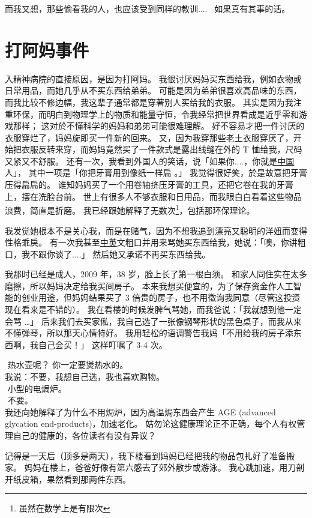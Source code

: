\documentclass[12pt]{report}
\newcommand{\tab}{\hspace*{1cm}}
\newcommand*\dashh{\textemdash\,\,}
\begin{document}
而我又想，那些偷看我的人，也应该受到同样的教训....~ 如果真有其事的话。

\chapter{打阿妈事件}

入精神病院的直接原因，是因为打阿妈。 我很讨厌妈妈买东西给我，例如衣物或日常用品，而她几乎从不买东西给弟弟。 可能是因为弟弟很喜欢高品味的东西，而我比较不修边幅，我这辈子通常都是穿著别人买给我的衣服。 其实是因为我注重环保，而明白到物理学上的物质和能量守恒，令我经常把世界看成是近乎零和游戏那样； 这对於不懂科学的妈妈和弟弟可能很难理解。 好不容易才把一件讨厌的衣服穿烂了，妈妈旋即买一件新的回来。 又，因为我穿那些老土衣服穿厌了，开始把衣服反转来穿，而妈妈竟然买了一件款式是露出线缝在外的 T 恤给我，尺码又紧又不舒服。 还有一次，我看到外国人的笑话，说「如果你....，你就是\uline{中国}人」， 其中一项是「你把牙膏用到像纸一样扁 。」 我觉得很好笑，於是故意把牙膏压得扁扁的。 谁知妈妈买了一个用卷轴挤压牙膏的工具，还把它卷在我的牙膏上，摆在洗脸台前。 世上有很多人不够衣服和日用品，而我眼白白看着这些物品浪费，简直是折磨。 我已经跟她解释了无数次\footnote{虽然在数学上是有限次}，包括那环保理论。

我发觉她根本不是关心我，而是在赌气，因为不想我追到漂亮又聪明的洋妞而变得性格乖戾。 有一次我甚至\uline{中英}文粗口并用来骂她买东西给我，她说：「噢，你讲粗口，我不跟你谈了....」 然后她又承诺不再买东西给我。

我那时已经是成人，2009 年，38 岁，脸上长了第一根白须。 和家人同住实在太多磨擦，所以妈妈决定给我买间房子。 本来我想买便宜的，为了保存资金作人工智能的创业用途，但妈妈结果买了 3 倍贵的房子，也不用徵询我同意（尽管这投资现在看来是不错的）。 我在看楼的时候发脾气骂她，而我爸说：「我就想到他一定会骂 …」 后来我们去买家俬，我自己选了一张像钢琴形状的黑色桌子，而我从来不懂弹琴，所以那天心情特好。 我用轻松的语调警告我妈「不用给我的房子添东西啊，我自己会买！」 这样叮嘱了 3-4 次。

\tab \dashh 热水壶呢？ 你一定要煲热水的。\\
\tab 我说：不要，我想自己选，我也喜欢购物。\\
\tab \dashh 小型的电焗炉。\\
\tab \dashh 不要。\\
我还向她解释了为什么不用焗炉，因为高温焗东西会产生 AGE (advanced glycation end-products)，加速老化。 姑勿论这健康理论正不正确，每个人有权管理自己的健康的，各位读者有没有异议？

记得是一天后（顶多是两天），我下楼看到妈妈已经把我的物品包扎好了准备搬家。 妈妈在楼上，爸爸好像有第六感去了郊外散步或游泳。 我心跳加速，用刀剖开纸皮箱，果然看到那两件东西。
\end{document}
